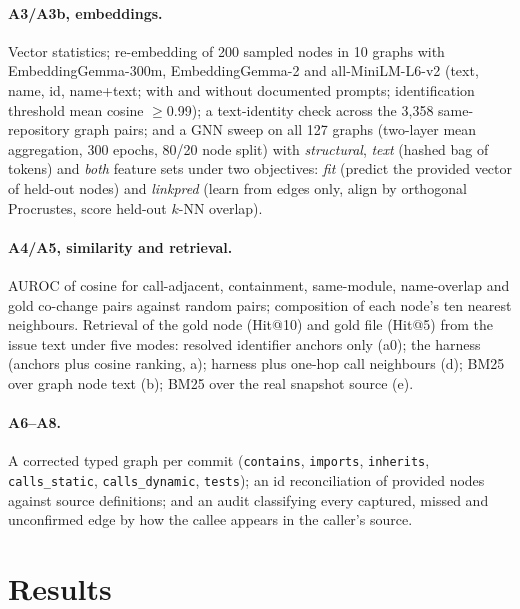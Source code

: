 \documentclass[10pt,a4paper]{article}
\begin{document}
\paragraph{A3/A3b, embeddings.} Vector statistics; re-embedding of 200 sampled nodes in 10 graphs with EmbeddingGemma-300m, EmbeddingGemma-2 and all-MiniLM-L6-v2 (text, name, id, name+text; with and without documented prompts; identification threshold mean cosine $\ge$0.99); a text-identity check across the 3{,}358 same-repository graph pairs; and a GNN sweep on all 127 graphs (two-layer mean aggregation, 300 epochs, 80/20 node split) with \emph{structural}, \emph{text} (hashed bag of tokens) and \emph{both} feature sets under two objectives: \emph{fit} (predict the provided vector of held-out nodes) and \emph{linkpred} (learn from edges only, align by orthogonal Procrustes, score held-out $k$-NN overlap).

\paragraph{A4/A5, similarity and retrieval.} AUROC of cosine for call-adjacent, containment, same-module, name-overlap and gold co-change pairs against random pairs; composition of each node's ten nearest neighbours. Retrieval of the gold node (Hit@10) and gold file (Hit@5) from the issue text under five modes: resolved identifier anchors only (a0); the harness (anchors plus cosine ranking, a); harness plus one-hop call neighbours (d); BM25 over graph node text (b); BM25 over the real snapshot source (e).

\paragraph{A6--A8.} A corrected typed graph per commit (\texttt{contains}, \texttt{imports}, \texttt{inherits}, \texttt{calls\_static}, \texttt{calls\_dynamic}, \texttt{tests}); an id reconciliation of provided nodes against source definitions; and an audit classifying every captured, missed and unconfirmed edge by how the callee appears in the caller's source.

\section{Results}
\end{document}
